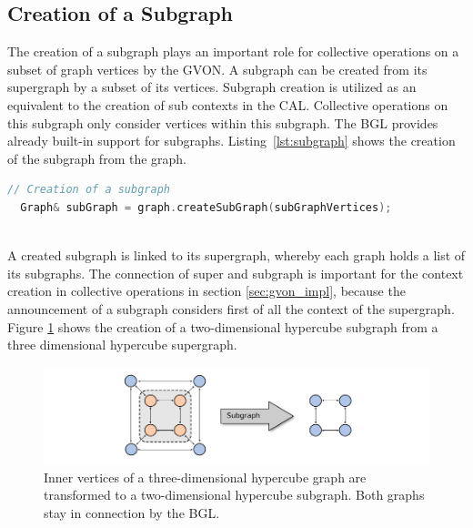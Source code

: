 \subsection{Creation of a Subgraph}
The creation of a subgraph plays an important role for collective
operations on a subset of graph vertices by the GVON. A subgraph can
be created from its supergraph by a subset of its vertices.  Subgraph
creation is utilized as an equivalent to the creation of sub contexts
in the CAL. Collective operations on this subgraph only consider
vertices within this subgraph. The BGL provides already built-in support
for subgraphs. Listing~\ref{lst:subgraph} shows the creation of the
subgraph from the graph.

\begin{lstlisting}[language=C++, label=lst:subgraph]
  // Creation of a subgraph
  Graph& subGraph = graph.createSubGraph(subGraphVertices);
  
\end{lstlisting}

\noindent A created subgraph is linked to its supergraph, whereby each graph
holds a list of its subgraphs. The connection of super and subgraph is
important for the context creation in collective operations in section
\ref{sec:gvon_impl}, because the announcement of a subgraph considers
first of all the context of the supergraph. Figure
\ref{fig:subgraph_creation} shows the creation of a two-dimensional
hypercube subgraph from a three dimensional hypercube supergraph.

\begin{figure}[H]
  \centering
  \includegraphics[width=\textwidth]{graphics/40_subgraph_creation}
  \caption{Inner vertices of a three-dimensional hypercube graph are 
  transformed to a two-dimensional hypercube subgraph. Both graphs
  stay in connection by the BGL.}
  \label{fig:subgraph_creation}
\end{figure}

